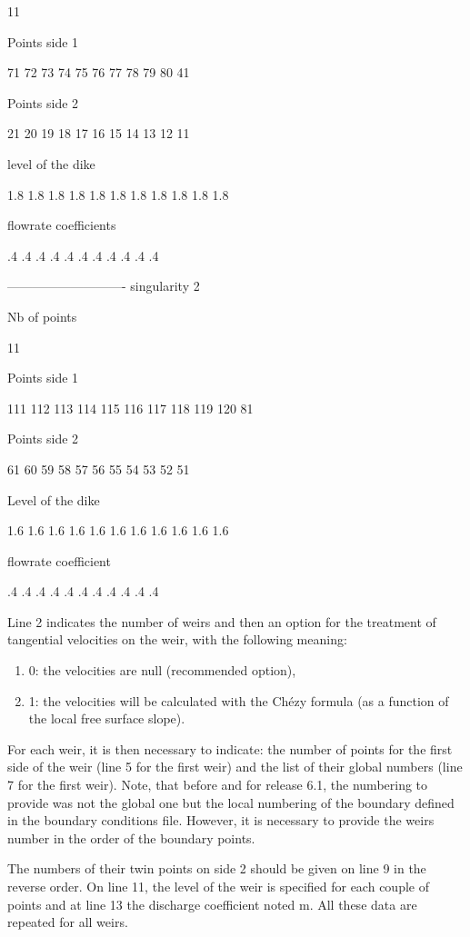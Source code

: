 \documentclass{article} %
\begin{document}
 11

 Points side 1

 71 72 73 74 75 76 77 78 79 80 41

 Points side 2

 21 20 19 18 17 16 15 14 13 12 11

 level of the dike

 1.8 1.8 1.8 1.8 1.8 1.8 1.8 1.8 1.8 1.8 1.8

 flowrate coefficients

  .4  .4  .4  .4  .4  .4  .4  .4  .4  .4  .4

 ---------------------------- singularity 2

 Nb of points

 11

 Points side 1

 111 112 113 114 115 116 117 118 119 120 81

 Points side 2

 61 60 59 58 57 56 55 54 53 52 51

 Level of the dike

 1.6 1.6 1.6 1.6 1.6 1.6 1.6 1.6 1.6 1.6 1.6

 flowrate coefficient

  .4  .4  .4  .4  .4  .4  .4  .4  .4  .4  .4



 Line 2 indicates the number of weirs and then an option for the treatment of tangential velocities on the weir, with the following meaning:

\begin{enumerate}
\item  0: the velocities are null (recommended option),

\item  1: the velocities will be calculated with the Ch\'{e}zy formula (as a function of the local free surface slope).
\end{enumerate}

 For each weir, it is then necessary to indicate: the number of points for the first side of the weir (line 5 for the first weir) and the list of their global numbers (line 7 for the first weir). Note, that before and for release 6.1, the numbering to provide was not the global one but the local numbering of the boundary defined in the boundary conditions file. However, it is necessary to provide the weirs number in the order of the boundary points.

 The numbers of their twin points on side 2 should be given on line 9 in the reverse order. On line 11, the level of the weir is specified for each couple of points and at line 13 the discharge coefficient noted m. All these data are repeated for all weirs.
\end{document}
